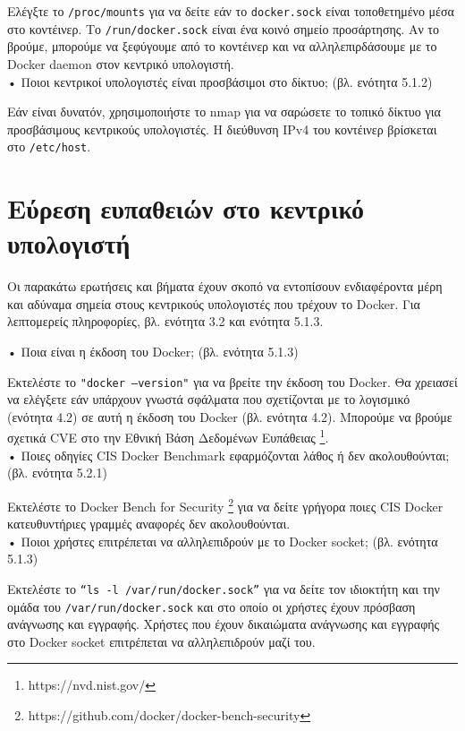 Ελέγξτε το \texttt{\textlatin{/proc/mounts}} για να δείτε εάν το
\texttt{\textlatin{docker.sock}} είναι τοποθετημένο μέσα στο κοντέινερ.
Το \texttt{\textlatin{/run/docker.sock}} είναι ένα κοινό σημείο προσάρτησης. Αν
το βρούμε, μπορούμε να ξεφύγουμε από το κοντέινερ και να αλληλεπιρδάσουμε με το
\textlatin{Docker daemon} στον κεντρικό υπολογιστή. \\


• Ποιοι κεντρικοί υπολογιστές είναι προσβάσιμοι στο δίκτυο; (βλ. ενότητα 5.1.2)

Εάν είναι δυνατόν, χρησιμοποιήστε το \textlatin{nmap} για να σαρώσετε το τοπικό
δίκτυο για προσβάσιμους κεντρικούς υπολογιστές. Η διεύθυνση \textlatin{IPv4} του
κοντέινερ βρίσκεται στο \texttt{\textlatin{/etc/host}}. \\


\section{Εύρεση ευπαθειών στο κεντρικό υπολογιστή}

Οι παρακάτω ερωτήσεις και βήματα έχουν σκοπό να εντοπίσουν ενδιαφέροντα μέρη
και αδύναμα σημεία στους κεντρικούς υπολογιστές που τρέχουν το
\textlatin{Docker}. Για λεπτομερείς πληροφορίες, βλ. ενότητα 3.2 και ενότητα
5.1.3.


• Ποια είναι η έκδοση του \textlatin{Docker}; (βλ. ενότητα 5.1.3)

Εκτελέστε το \texttt{\textlatin{"docker --version"}} για να βρείτε την έκδοση του
\textlatin{Docker}. Θα χρειασεί να ελέγξετε εάν υπάρχουν γνωστά σφάλματα που
σχετίζονται με το λογισμικό (ενότητα 4.2) σε αυτή η έκδοση του
\textlatin{Docker} (βλ. ενότητα 4.2). Μπορούμε να βρούμε σχετικά \textlatin{CVE}
στο την Εθνική Βάση Δεδομένων Ευπάθειας
\footnote{\textlatin{https://nvd.nist.gov/}}. \\

• Ποιες οδηγίες \textlatin{CIS Docker Benchmark} εφαρμόζονται λάθος ή δεν
ακολουθούνται; (βλ. ενότητα 5.2.1)

Εκτελέστε το \textlatin{Docker Bench for Security}
\footnote{\textlatin{https://github.com/docker/docker-bench-security}}
για να δείτε γρήγορα ποιες \textlatin{CIS Docker} κατευθυντήριες γραμμές
αναφορές δεν ακολουθούνται. \\


• Ποιοι χρήστες επιτρέπεται να αλληλεπιδρούν με το \textlatin{Docker socket};
(βλ. ενότητα 5.1.3)

Εκτελέστε το \texttt{\textlatin{“ls -l /var/run/docker.sock”}} για να δείτε τον
ιδιοκτήτη και την ομάδα του \texttt{\textlatin{/var/run/docker.sock}} και στο
οποίο οι χρήστες έχουν πρόσβαση ανάγνωσης και εγγραφής. Χρήστες που έχουν
δικαιώματα ανάγνωσης και εγγραφής στο \textlatin{Docker socket} επιτρέπεται να
αλληλεπιδρούν μαζί του. \\

